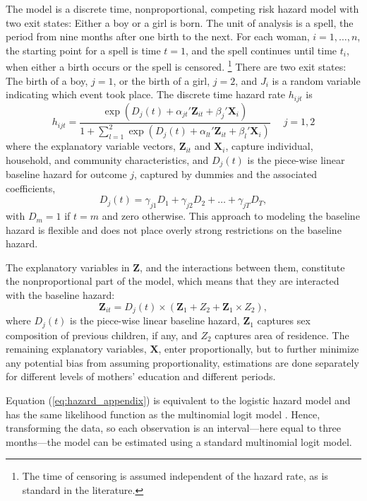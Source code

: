 \documentclass[12pt,letterpaper]{article}
\begin{document}
The model is a discrete time, nonproportional, competing risk hazard model with two exit 
states: Either a boy or a girl is born.
The unit of analysis is a spell, the period from nine months after one birth to the next.
For each woman, $i=1,\ldots,n$, the starting point for a spell is time $t=1$, and 
the spell continues until time $t_i$, when either a birth occurs or the spell 
is censored.%
\footnote{
The time of censoring is assumed independent of the hazard rate,
as is standard in the literature.
}
There are two exit states: The birth of a boy, $j=1$, or the birth of a girl, $j=2$, and 
$J_i$ is a random variable indicating which event took place.
The discrete time hazard rate $h_{ijt}$ is 
\begin{equation}
 h_{ijt} = \frac{\exp(D_j(t) + \alpha_{jt}'\mathbf{Z}_{it} + \beta_j'\mathbf{X}_{i})} 
 {1 + \sum_{l=1}^2 \exp(D_j(t) + \alpha_{lt}'\mathbf{Z}_{it} + \beta_l'\mathbf{X}_{i})} \: \: \; \; \;  j = 1,2
 \label{eq:hazard_appendix}
\end{equation}
where the explanatory variable vectors, $\mathbf{Z}_{it}$ and $\mathbf{X}_{i}$, capture 
individual, household, and community characteristics,
and $D_{j}(t)$ is the piece-wise linear baseline hazard for outcome $j$, captured
by dummies and the associated coefficients,
\begin{equation}
D_j(t) = \gamma_{j1} D_1 + \gamma_{j2} D_2 + \ldots + \gamma_{jT} D_T,
\end{equation}
with $D_m = 1$ if $t=m$ and zero otherwise.
This approach to modeling the baseline hazard is flexible and does not place 
overly strong restrictions on the baseline hazard.

The explanatory variables in $\mathbf{Z}$, and the interactions between them, 
constitute the nonproportional part of the model, which means that they are
interacted with the baseline hazard:
\begin{equation}
 \mathbf{Z}_{it} = D_j(t) \times (\mathbf{Z}_1 + Z_2 + \mathbf{Z}_1 \times Z_2),
\end{equation}
where $D_j(t)$ is the piece-wise linear baseline hazard, $\mathbf{Z}_1$ captures sex 
composition of previous children, if any, and $Z_2$ captures area of residence.
The remaining explanatory variables, $\mathbf{X}$, enter proportionally,
but to further minimize any potential bias from assuming proportionality, estimations 
are done separately for different levels of mothers' education and different 
periods.

Equation (\ref{eq:hazard_appendix}) is equivalent to the logistic hazard model and has the same 
likelihood function as the multinomial logit model \citep{allison82,jenkins95}.
Hence, transforming the data, so each observation is an interval---here equal
to three months---the model can be estimated using a standard multinomial logit model.
\end{document}
